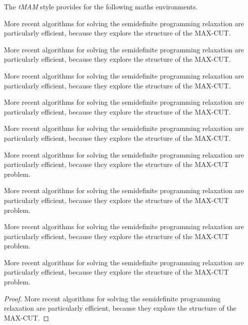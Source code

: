 \documentclass[]{tMAM2e}
\begin{document}
The {\it tMAM} style provides for the following maths environments.

\begin{lemma}
More recent algorithms for solving the semidefinite programming
relaxation are particularly efficient, because they explore the structure
of the MAX-CUT.
\end{lemma}
\begin{theorem}
More recent algorithms for solving the semidefinite programming
relaxation are particularly efficient, because they explore the structure
of the MAX-CUT.
\end{theorem}
\begin{corollary}
More recent algorithms for solving the semidefinite programming
relaxation are particularly efficient, because they explore the
structure of the MAX-CUT.
\end{corollary}
\begin{proposition}
More recent algorithms for solving the semidefinite programming
relaxation are particularly efficient, because they explore the structure
of the MAX-CUT.
\end{proposition}
\begin{conjecture}
More recent algorithms for solving the semidefinite programming
relaxation are particularly efficient, because they explore the structure
of the MAX-CUT.
\end{conjecture}
\begin{example}
More recent algorithms for solving the semidefinite programming
relaxation are particularly efficient, because they explore the
structure of the MAX-CUT problem.
\end{example}
\begin{fact}
More recent algorithms for solving the semidefinite programming
relaxation are particularly efficient, because they explore the
structure of the MAX-CUT problem.
\end{fact}
\begin{remark}
More recent algorithms for solving the semidefinite programming
relaxation are particularly efficient, because they explore the
structure of the MAX-CUT problem.
\end{remark}
\begin{algorithm}
More recent algorithms for solving the semidefinite programming
relaxation are particularly efficient, because they explore the
structure of the MAX-CUT problem.
\end{algorithm}
\begin{proof}
More recent algorithms for solving the semidefinite programming
relaxation are particularly efficient, because they explore the structure
of the MAX-CUT.
\end{proof}
\end{document}
